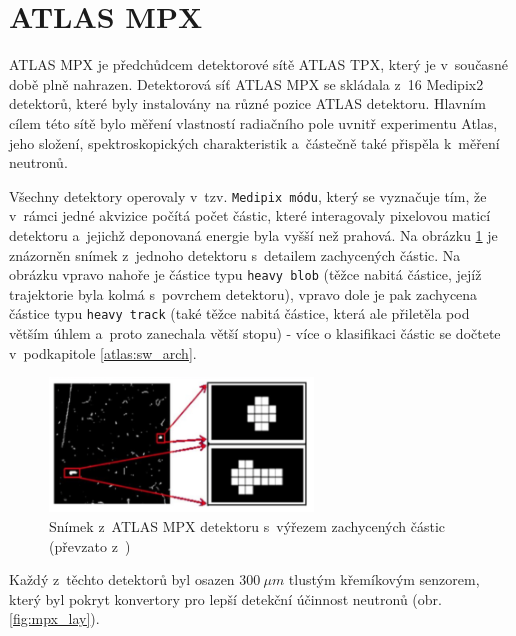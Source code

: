 \section{ATLAS MPX}\label{atlas:mpx}
ATLAS MPX\cite{Vykydal200935}\cite{atlasmpx} je předchůdcem detektorové sítě ATLAS TPX, který je v~současné době plně nahrazen. Detektorová síť ATLAS MPX se skládala z~16 Medipix2 detektorů, které byly instalovány na různé pozice ATLAS detektoru. Hlavním cílem této sítě bylo měření vlastností radiačního pole uvnitř experimentu Atlas, jeho složení, spektroskopických charakteristik a~částečně také přispěla k~měření neutronů. 


Všechny detektory operovaly v~tzv. \texttt{Medipix módu}, který se vyznačuje tím, že v~rámci jedné akvizice počítá počet částic, které interagovaly pixelovou maticí detektoru a~jejichž deponovaná energie byla vyšší než prahová. Na obrázku \ref{fig:mpx_cluster} je znázorněn snímek z~jednoho detektoru s~detailem zachycených částic. Na obrázku vpravo nahoře je částice typu \texttt{heavy blob} (těžce nabitá částice, jejíž trajektorie byla kolmá s~povrchem detektoru), vpravo dole je pak zachycena částice typu \texttt{heavy track} (také těžce nabitá částice, která ale přiletěla pod větším úhlem a~proto zanechala větší stopu) - více o klasifikaci částic se dočtete v~podkapitole \ref{atlas:sw_arch}.


\begin{figure}[ht]
	\begin{center}
		\includegraphics[width=7cm]{figures/mpx_cluster.png}
		\caption{Snímek z~ATLAS MPX detektoru s~výřezem zachycených částic (převzato z~\cite{atlasmpx})}
		\label{fig:mpx_cluster}
	\end{center}
\end{figure}


Každý z~těchto detektorů byl osazen $300~\mu m$ tlustým křemíkovým senzorem, který byl pokryt konvertory pro lepší detekční účinnost neutronů (obr. \ref{fig:mpx_lay}).

